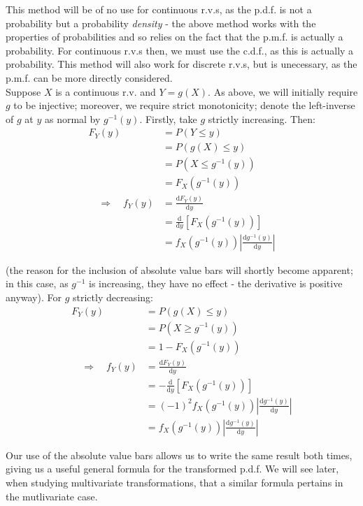 \documentclass[12pt,a4paper]{article}
\newcommand{\diff}{\mathrm{d}}
\newcommand{\imply}{\quad\Rightarrow\quad}
\begin{document}
This method will be of no use for continuous r.v.s, as the p.d.f. is not a probability but a probability {\it density} - the above method works with the properties of probabilities and so relies on the fact that the p.m.f. is actually a probability. For continuous r.v.s then, we must use the c.d.f., as this is actually a probability. This method will also work for discrete r.v.s, but is unecessary, as the p.m.f. can be more directly considered.\\
\indent Suppose $X$ is a continuous r.v. and $Y = g(X)$. As above, we will initially require $g$ to be injective; moreover, we require strict monotonicity; denote the left-inverse of $g$ at $y$ as normal by $g^{-1}(y)$. Firstly, take $g$ strictly increasing. Then:
\begin{align*}
F_Y(y) &= P(Y \leq y)\\
&= P(g(X) \leq y)\\
&= P\left(X \leq g^{-1}(y)\right)\\
&= F_X\left(g^{-1}(y)\right)\\
\imply f_Y(y) &= \frac{\mathrm{d}F_Y(y)}{\mathrm{d}y}\\
&= \frac{\mathrm{d}}{\mathrm{d}y}\left[F_X\left(g^{-1}(y)\right)\right]\\
&= f_X\left(g^{-1}(y)\right) \left|\frac{\mathrm{d}g^{-1}(y)}{\mathrm{d}y}\right|
\end{align*}

(the reason for the inclusion of absolute value bars will shortly become apparent; in this case, as $g^{-1}$ is increasing, they have no effect - the derivative is positive anyway). For $g$ strictly decreasing:
\begin{align*}
F_Y(y) &= P(g(X)\leq y)\\
&= P(X\geq g^{-1}(y))\\
&= 1 - F_X(g^{-1}(y))\\
\imply f_Y(y) &= \frac{\diff F_Y(y)}{\diff y}\\
&= -\frac{\diff}{\diff y}\left[F_X(g^{-1}(y))\right]\\
&= (-1)^2 f_X(g^{-1}(y))\left| \frac{\diff g^{-1}(y)}{\diff y}\right| \\
&= f_X(g^{-1}(y))\left|\frac{\diff g^{-1}(y)}{\diff y}\right|
\end{align*}

Our use of the absolute value bars allows us to write the same result both times, giving us a useful general formula for the transformed p.d.f. We will see later, when studying multivariate transformations, that a similar formula pertains in the mutlivariate case.
\end{document}
